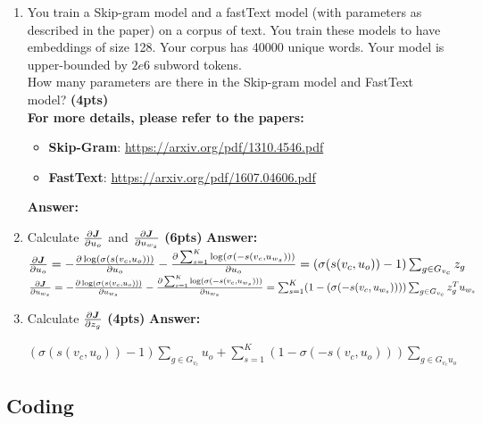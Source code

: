 \documentclass{assignment format}
\newenvironment{answer}{
    {\bf Answer:} \begingroup\color{red}
}{\endgroup}%
\begin{document}
\begin{enumerate}[label=(\alph*)]
    \item You train a Skip-gram model and a fastText model (with parameters as described in the paper) on a corpus of text. You train these models to have embeddings of size 128. Your corpus has 40000 unique words. Your model is upper-bounded by $2e6$ subword tokens. \\
    How many parameters are there in the Skip-gram model and FastText model? \textbf{(4pts)}\\ 
    \textbf{For more details, please refer to the papers:}
    \begin{itemize} 
\item \textbf{Skip-Gram}: \url{https://arxiv.org/pdf/1310.4546.pdf}
\item \textbf{FastText}: \url{https://arxiv.org/pdf/1607.04606.pdf}
\end{itemize} 
\begin{answer}
\end{answer}
    \item Calculate $\pdv{\bm J}{u_o}$  and $\pdv{\bm J}{u_{w_s}}$
    \textbf{(6pts)}
    \newline
\begin{answer}\\
$\pdv{\bm J}{u_o} = - \pdv{\log(\sigma(s(v_c, u_o)))}{u_o}  - \pdv{\sum_{s=1}^K \log(\sigma(-s(v_c, u_{w_s})))}{u_o} = (\sigma(s(v_c, u_o))-1)\sum_{g \in G_{v_c}} z_g
$  \\
$\pdv{\bm J}{u_{w_s}} = - \pdv{\log(\sigma(s(v_c, u_o)))}{u_{w_s}}  - \pdv{\sum_{s=1}^K \log(\sigma(-s(v_c, u_{w_s})))}{u_{w_s}} = \sum_{s=1}^K (1-(\sigma(-s(v_c, u_{w_s}))))\sum_{g \in G_{v_c}} z_g^T u_{w_s}
$
\end{answer}
    \item Calculate  $\pdv{\bm J}{z_g}$
\textbf{(4pts)}%
\begin{answer}
$ (\sigma(s(v_c, u_o))-1)\sum_{g \in G_{v_c}}u_o + \sum_{s=1}^K(1-\sigma(-s(v_c,u_o)))\sum_{g \in G_{v_c}u_o}
$
\end{answer}
    
\end{enumerate}

\subsection{Coding}
\end{document}
